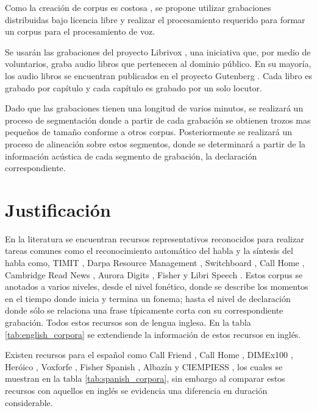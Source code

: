 Como la creación de corpus es costosa \cite{googleTTSLatinAmericanSpanishCorpus}, se propone utilizar grabaciones distribuidas bajo licencia libre y realizar el procesamiento requerido para formar un corpus para el procesamiento de voz.

Se usarán las grabaciones del proyecto Librivox \cite{LibriVox}, una iniciativa que, por medio de voluntarios, graba audio libros que pertenecen al dominio público. En su mayoría, los audio libros se encuentran publicados en el proyecto Gutenberg \cite{gutenberg}. Cada libro es grabado por capítulo y cada capítulo es grabado por un solo locutor.

Dado que las grabaciones tienen una longitud de varios minutos, se realizará un proceso de segmentación donde a partir de cada grabación se obtienen trozos mas pequeños de tamaño conforme a otros corpus. Posteriormente se realizará un proceso de alineación sobre estos segmentos, donde se determinará a partir de la información acústica de cada segmento de grabación, la declaración correspondiente.


\section{Justificación}

En la literatura se encuentran recursos representativos reconocidos para realizar tareas comunes como el reconocimiento automático del habla y la síntesis del habla como, TIMIT \cite{PriceTheRecognition}, Darpa Resource Management \cite{Lucke1992ExpandingCorpus}, Switchboard \cite{Godfrey1992SWITCHBOARD:Development}, Call Home  \cite{Fu-HuaLiuSpeechCorpus},  Cambridge Read News \cite{RobinsonWSJCAM0:RECOGNITION}, Aurora Digits \cite{EvansEfficientCorpus}, Fisher \cite{CieriTheSpeech-to-Text} y Libri Speech \cite{LIBRISPEECH}. Estos corpus se anotados a varios niveles, desde el nivel fonético, donde se describe los momentos en el tiempo donde inicia y termina un fonema; hasta el nivel de declaración donde s\'olo se relaciona una frase típicamente corta con su correspondiente grabación. Todos estos recursos son de lengua inglesa. En la tabla \ref{tab:english_corpora} se extendiende la información de estos recursos en inglés.



Existen recursos para el español como Call Friend \cite{CALLFRIENDSpa}, Call Home \cite{CALLHOMESpa}, DIMEx100 \cite{Pineda2004DIMEx100:Spanish}, Heróico \cite{heroico}, Voxforfe \cite{Voxforge.org}, Fisher Spanish \cite{FischerSpa}, Albazín \cite{CampilloAlbayzinEvaluation} y CIEMPIESS \cite{Hernandez-MenaCIEMPIESS:Corpus}, los cuales se muestran en la tabla \ref{tab:spanish_corpora}, sin embargo al comparar estos recursos con aquellos en inglés se evidencia una diferencia en duración considerable.

